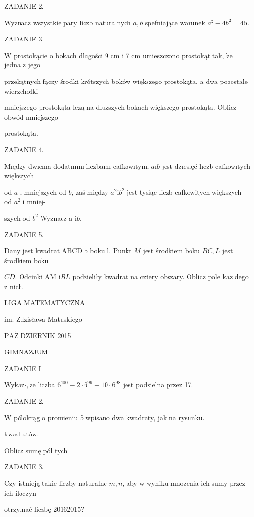 \documentclass[a4paper,12pt]{article}
\begin{document}
ZADANIE 2.

Wyznacz wszystkie pary liczb naturalnych $a, b$ spefniające warunek $a^{2}-4b^{2}=45.$

ZADANIE 3.

$\mathrm{W}$ prostokącie o bokach dlugości 9 cm i 7 cm umieszczono prostokąt tak, $\dot{\mathrm{z}}\mathrm{e}$ jedna z jego

przekątnych fączy środki krótszych boków większego prostokąta, a dwa pozostale wierzchołki

mniejszego prostokąta lezą na dluzszych bokach większego prostokąta. Oblicz obwód mniejszego

prostokąta.

ZADANIE 4.

Między dwiema dodatnimi liczbami cafkowitymi $a\mathrm{i}b$ jest dziesięć liczb cafkowitych większych

od $a$ i mniejszych od $b$, zaś między $a^{2}\mathrm{i}b^{2}$ jest tysiąc liczb cafkowitych większych od $a^{2}$ i mniej-

szych od $b^{2}$ Wyznacz a $\mathrm{i}b.$

ZADANIE 5.

Dany jest kwadrat ABCD o boku l. Punkt $M$ jest środkiem boku $BC, L$ jest środkiem boku

$CD$. Odcinki AM $\mathrm{i}BL$ podzieliły kwadrat na cztery obszary. Oblicz pole $\mathrm{k}\mathrm{a}\dot{\mathrm{z}}$ dego z nich.






LIGA MATEMATYCZNA

im. Zdzisława Matuskiego

$\mathrm{P}\mathrm{A}\dot{\mathrm{Z}}$ DZIERNIK 2015

GIMNAZJUM

ZADANIE I.

Wykaz$\cdot, \dot{\mathrm{z}}\mathrm{e}$ liczba $6^{100}-2\cdot 6^{99}+10\cdot 6^{98}$ jest podzielna przez 17.

ZADANIE 2.

$\mathrm{W}$ pólokrąg o promieniu 5 wpisano dwa kwadraty, jak na rysunku.

kwadratów.

Oblicz sumę pól tych

ZADANIE 3.

Czy istnieją takie liczby naturalne $m, n$, aby w wyniku mnozenia ich sumy przez ich iloczyn

otrzymač liczbę 20162015?
\end{document}

